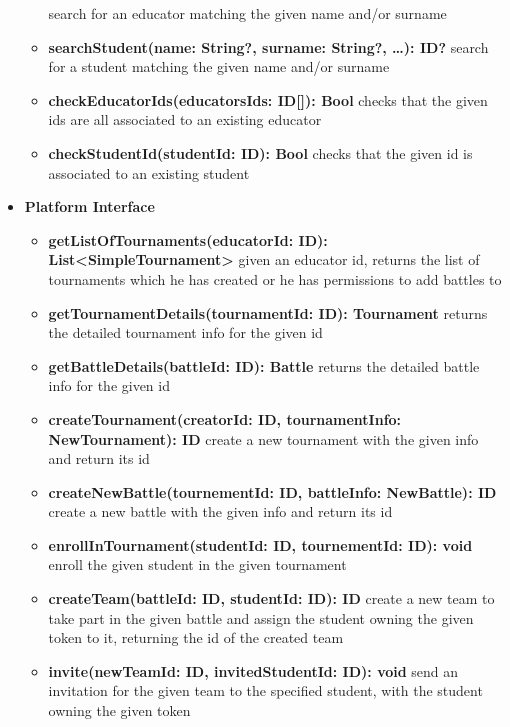 \begin{itemize}
\begin{itemize}
                    search for an educator matching the given name and/or surname
              \item \textbf{searchStudent(name: String?, surname: String?, \ldots): ID?}
                    search for a student matching the given name and/or surname
              \item \textbf{checkEducatorIds(educatorsIds: ID[]): Bool}
                    checks that the given ids are all associated to an existing educator
              \item \textbf{checkStudentId(studentId: ID): Bool}
                    checks that the given id is associated to an existing student
          \end{itemize}
    \item \textbf{Platform Interface}
          \begin{itemize}
              \item \textbf{getListOfTournaments(educatorId: ID): List<SimpleTournament>}
                    given an educator id, returns the list of tournaments which he has created
                    or he has permissions to add battles to
              \item \textbf{getTournamentDetails(tournamentId: ID): Tournament}
                    returns the detailed tournament info for the given id
              \item \textbf{getBattleDetails(battleId: ID): Battle}
                    returns the detailed battle info for the given id
              \item \textbf{createTournament(creatorId: ID, tournamentInfo: NewTournament): ID}
                    create a new tournament with the given info and return its id
              \item \textbf{createNewBattle(tournementId: ID, battleInfo: NewBattle): ID}
                    create a new battle with the given info and return its id
              \item \textbf{enrollInTournament(studentId: ID, tournementId: ID): void}
                    enroll the given student in the given tournament
              \item \textbf{createTeam(battleId: ID, studentId: ID): ID}
                    create a new team to take part in the given battle and assign the student owning the given token
                    to it, returning the id of the created team
              \item \textbf{invite(newTeamId: ID, invitedStudentId: ID): void}
                    send an invitation for the given team to the specified student, with the student owning the given token

\end{itemize}
\end{itemize}
